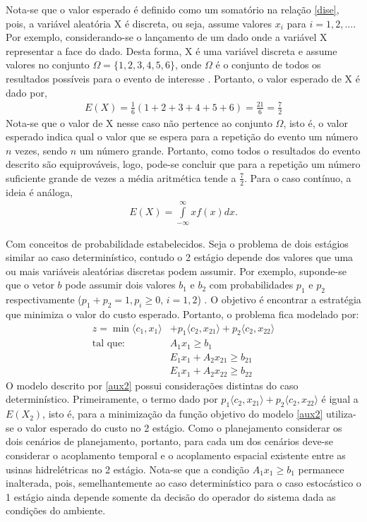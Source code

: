 Nota-se que o valor esperado \'e
definido como um somat\'orio na rela\c c\~ao \ref{dise}, pois, a vari\'avel aleat\'oria X \'e discreta, ou seja, assume
valores $x_i$ para $i= 1,2, \dots$\cite{magalhaes}. Por exemplo,
considerando-se o lan\c camento de um dado onde a vari\'avel X representar a face do dado. Desta forma, X \'e uma
vari\'avel discreta
e assume valores no conjunto
$\Omega = \{1,2,3,4,5,6\}$, onde $\Omega$ \'e o conjunto de todos os resultados poss\'iveis para o evento de
interesse \cite{james}.
Portanto, o valor esperado de X \'e dado por,
	\begin{align*}
		E(X) = \frac{1}{6}(1 + 2 + 3 + 4 + 5 + 6) = \frac{21}{6} = \frac{7}{2}
	\end{align*}
Nota-se que o valor de X nesse caso n\~ao pertence ao conjunto $\Omega$, isto \'e, o valor esperado indica qual o valor
que se espera para a repeti\c c\~ao do evento um n\'umero  $n$ vezes, sendo $n$ um n\'umero grande. Portanto, como todos
o resultados do evento descrito s\~ao equiprov\'aveis, logo, pode-se concluir que para a repeti\c c\~ao um n\'umero
suficiente grande de vezes a m\'edia aritm\'etica tende a $\frac{7}{2}$. Para o caso
cont\'{i}nuo, a ideia \'{e} an\'{a}loga,
	\begin{align*}
		E(X) = \int\limits_{-\infty}^{\infty} xf(x) dx.
	\end{align*}

Com conceitos de probabilidade estabelecidos. Seja o problema de dois est\'agios similar ao caso determin\'istico,
contudo o 2 est\'agio depende dos valores
que uma ou mais vari\'aveis aleat\'orias discretas podem assumir. Por exemplo, suponde-se que o vetor $b$ pode assumir dois
valores $b_1$ e $b_2$ com
probabilidades $p_1$ e $p_2$ respectivamente ($p_1 + p_2 = 1, p_i \geq 0$, $i = 1, 2$) \cite{cp}. O objetivo \'e encontrar a estrat\'egia que
minimiza o
valor do custo esperado. Portanto, o problema fica modelado por:
\begin{align}
	\label{aux2}
  z = \min  \langle c_1,x_1\rangle &+ p_1\langle c_2,x_{21}\rangle + p_2\langle c_2,x_{22}\rangle \nonumber\\	
 \mbox{tal que: }&	A_1 x_1 \geq b_1 \\
	&E_1 x_1 + A_2 x_{21} \geq b_{21} \nonumber\\
	&E_1 x_1 + A_2x_{22} \geq b_{22} \nonumber
\end{align}
O modelo descrito por \ref{aux2} possui considera\c c\~oes distintas do caso determin\'istico. Primeiramente, o termo
dado por $p_1\langle c_2,x_{21}\rangle + p_2\langle c_2,x_{22}\rangle $ \'e igual a $E(X_2)$, isto \'e, para a minimiza\c c\~ao da
fun\c c\~ao objetivo do modelo \ref{aux2} utiliza-se o valor esperado do custo no 2 est\'agio. Como o planejamento
considerar os dois cen\'arios de planejamento, portanto, para cada um dos cen\'arios deve-se considerar o acoplamento
temporal e o acoplamento espacial existente entre as usinas hidrel\'etricas no 2 est\'agio. Nota-se que a condi\c c\~ao
$A_1 x_1 \geq b_1$ permanece inalterada, pois, semelhantemente ao caso determin\'istico para o caso estoc\'astico o
1 est\'agio ainda depende somente da decis\~ao do operador do sistema dada as condi\c c\~oes do ambiente. 


